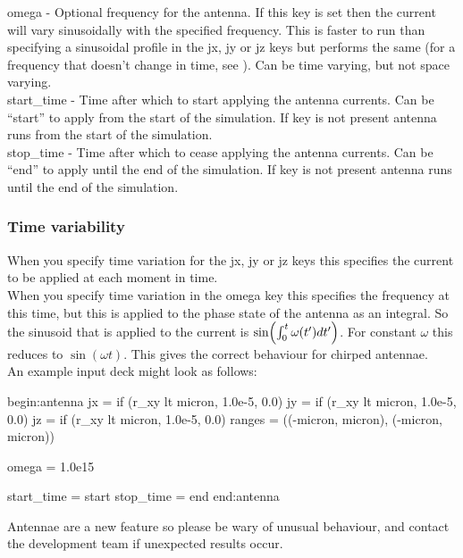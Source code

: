 {\emphtext omega} -  Optional frequency for the antenna. If this key is set
  then the current will vary sinusoidally with the specified frequency. This is
  faster to run than specifying a sinusoidal profile in the jx, jy or jz keys
  but performs the same (for a frequency that doesn't change in time, see
  ). Can be time varying, but not space varying.\\

{\emphtext start\_time} -  Time after which to start applying the antenna
  currents. Can be ``start'' to apply from the start of the simulation. If key
  is not present antenna runs from the start of the simulation.\\

{\emphtext stop\_time} - Time after which to cease applying the antenna
  currents. Can be ``end'' to apply until the end of the simulation. If key is
  not present antenna runs until the end of the simulation.\\

\subsubsection{Time variability}
\label{sec:time_variability}
When you specify time variation for the jx, jy or jz keys this specifies the
 current to be applied at each moment in time.\\

When you specify time variation in the omega key this specifies the frequency
at this time, but this is applied to the phase state of the antenna as an
integral. So the sinusoid that is applied to the current is
$\sin\Bigl(\int_0^t\omega(t')dt'\Bigr)$. For constant $\omega$ this reduces to
$\sin(\omega t)$. This gives the correct behaviour for chirped antennae.\\

An example input deck might look as follows:

\begin{boxverbatim}
begin:antenna
  jx = if (r_xy lt micron, 1.0e-5, 0.0)
  jy = if (r_xy lt micron, 1.0e-5, 0.0)
  jz = if (r_xy lt micron, 1.0e-5, 0.0)
  ranges = ((-micron, micron), (-micron, micron))

  omega = 1.0e15

  start_time = start
  stop_time = end
end:antenna
\end{boxverbatim}

{\emphtext
  Antennae are a new feature so please be wary of unusual behaviour, and
  contact the {\EPOCH} development team if unexpected results occur.}

